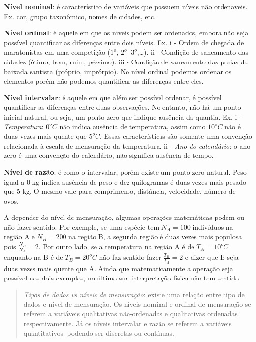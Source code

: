 \documentclass[
]{book}
\begin{document}
\textbf{Nível nominal}: é característico de variáveis que possuem níveis não ordenaveis. Ex. cor, grupo taxonômico, nomes de cidades, etc.

\textbf{Nível ordinal}: é aquele em que os níveis podem ser ordenados, embora não seja possível quantificar as diferenças entre dois níveis. Ex. i - Ordem de chegada de maratonistas em uma competição (\(1^o\), \(2^o\), \(3^o\),\ldots). ii - Condição de saneamento das cidades (ótimo, bom, ruim, péssimo). iii - Condição de saneamento das praias da baixada santista (próprio, imprórpio). No nível ordinal podemos ordenar os elementos porém não podemos quantificar as diferenças entre eles.

\textbf{Nível intervalar}: é aquele em que além ser possível ordenar, é possível quantificar as diferenças entre duas observações. No entanto, não há um ponto inicial natural, ou seja, um ponto zero que indique ausência da quantia. Ex. i -- \emph{Temperatura}: \(0^oC\) não indica ausência de temperatura, assim como \(10^oC\) não é duas vezes mais quente que \(5^oC\). Essas características são somente uma convenção relacionada à escala de mensuração da temperatura. ii - \emph{Ano do calendário}: o ano zero é uma convenção do calendário, não significa ausência de tempo.

\textbf{Nível de razão}: é como o intervalar, porém existe um ponto zero natural. Peso igual a 0 kg indica ausência de peso e dez quilogramas é duas vezes mais pesado que 5 kg. O mesmo vale para comprimento, distância, velocidade, número de ovos.

A depender do nível de mensuração, algumas operações matemáticas podem ou não fazer sentido. Por exemplo, se uma espécie tem \(N_A = 100\) indivíduos na região A e \(N_B = 200\) na região B, a segunda região é duas vezes mais populosa pois \(\frac{N_B}{N_A} = 2\). Por outro lado, se a temperatura na região A é de \(T_A = 10^oC\) enquanto na B é de \(T_B = 20^oC\) não faz sentido fazer \(\frac{T_B}{T_A} = 2\) e dizer que B seja duas vezes mais quente que A. Ainda que matematicamente a operação seja possível nos dois exemplos, no último sua interpretação física não tem sentido.

\begin{quote}
\emph{Tipos de dados vs níveis de mensuração}: existe uma relação entre tipo de dados e nível de mensuração. Os níveis nominal e ordinal de mensuração se referem a variáveis qualitativas não-ordenadas e qualitativas ordenadas respectivamente. Já os níveis intervalar e razão se referem a variáveis quantitativos, podendo ser discretas ou contínuas.
\end{quote}
\end{document}
